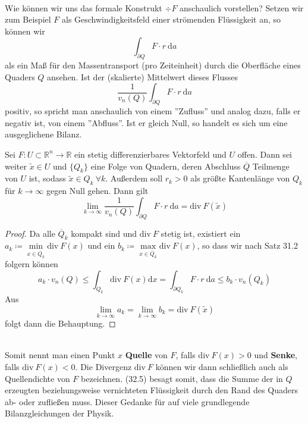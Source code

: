 \ \\
\linebreak
Wie können wir uns das formale Konstrukt $\div F$ 
anschaulich vorstellen? Setzen wir zum Beispiel $F$ als 
Geschwindigkeitsfeld einer strömenden Flüssigkeit an, so können 
wir  
\begin{equation*}
	\int_{\partial Q}F\cdot r \ \mathrm{d}a
\end{equation*}
als ein Maß für den Massentransport (pro Zeiteinheit) durch 
die Oberfläche eines Quaders $Q$ ansehen. Ist der (skalierte) 
Mittelwert dieses Flusses 
\begin{equation*}
	\frac{1}{v_n(Q)}\int_{\partial Q}F\cdot r \ \mathrm{d}a
\end{equation*}
positiv, so spricht man anschaulich von einem ''Zufluss'' und analog dazu, falls er negativ ist, von einem ''Abfluss''. Ist 
er gleich Null, so handelt es sich um eine ausgeglichene Bilanz.

\begin{lemma}
Sei $F:U\subset\mathbb{R}^n\rightarrow\mathbb{R}$ ein stetig 
differenzierbares Vektorfeld und $U$ offen. Dann sei weiter 
$\tilde{x}\in U$ und $\{Q_k\}$ eine Folge von Quadern, deren 
Abschluss $\overline{Q}$ Teilmenge von $U$ ist, sodass 
$\tilde{x}\in Q_k \ \forall k$. Außerdem soll $r_k>0$ als 
größte Kantenlänge von $Q_k$ für $k\rightarrow\infty$ gegen Null 
gehen. Dann gilt
\begin{equation}
	\lim\limits_{k\rightarrow\infty}\frac{1}{v_n(Q)}\int_{\partial Q} F\cdot r\ \mathrm{d}a = 
	\mathrm{div\ }F(\tilde{x})
\end{equation} 
\end{lemma}

\begin{proof}
Da alle $\overline{Q}_k$ kompakt sind und $\mathrm{div\ }F$ stetig ist, existiert ein $a_k\coloneqq\min\limits_{x\in\overline{Q}_k}\mathrm{div\ }F(x)$ und ein $b_k\coloneqq\max\limits_{x\in\overline{Q}_k}\mathrm{div\ }F(x)$, so dass 
wir nach Satz 31.2 folgern können
\begin{equation*}
	a_k\cdot v_n(Q)\leq\int_{Q_k}\mathrm{div\ }F(x)\mathrm{d}x 	= \int_{\partial Q_k}F\cdot r \ \mathrm{d}a \leq 
	b_k\cdot v_n(Q_k)
 \end{equation*}
Aus 
\begin{equation*}
	\lim\limits_{k\rightarrow\infty} a_k = 
	\lim\limits_{k\rightarrow\infty} b_k = 
	\mathrm{div\ }F(\tilde{x})
\end{equation*}
folgt dann die Behauptung.
\end{proof}
\ \\
\linebreak
Somit nennt man einen Punkt $x$ \textbf{Quelle} von $F$, falls 
$\mathrm{div\ }F(x)>0$ und \textbf{Senke}, falls $\mathrm{div\ }F(x)<0$. Die Divergenz $\mathrm{div\ }F$ können wir dann 
schließlich auch als Quellendichte von $F$ bezeichnen. (32.5) 
besagt somit, dass die Summe der in $Q$ erzeugten 
beziehungsweise vernichteten Flüssigkeit durch den Rand des 
Quaders ab- oder zufließen muss. Dieser Gedanke für auf viele 
grundlegende Bilanzgleichungen der Physik. 

